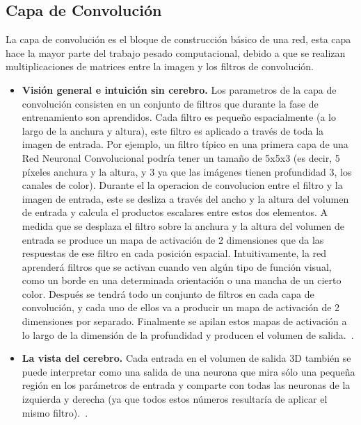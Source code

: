 \subsection{Capa de Convolución}
La capa de convolución es el bloque de construcción básico de una red, esta capa hace la mayor parte del trabajo pesado computacional, debido a que se realizan multiplicaciones de matrices entre la imagen y los filtros de convolución.
\begin{itemize}
\item \textbf{Visión general e intuición sin cerebro.} Los parametros de la capa de convolución consisten en un conjunto de filtros que durante la fase de entrenamiento son aprendidos. Cada filtro es pequeño espacialmente (a lo largo de la anchura y altura), este filtro es aplicado a través de toda la imagen de entrada. Por ejemplo, un filtro típico en una primera capa de una Red Neuronal Convolucional podría tener un tamaño de 5x5x3 (es decir, 5 píxeles anchura y la altura, y 3 ya que las imágenes tienen profundidad 3, los canales de color). Durante el la operacion de convolucion entre el filtro y la imagen de entrada, este se desliza a través del ancho y la altura del volumen de entrada y calcula el productos escalares entre estos dos elementos. A medida que se desplaza el filtro sobre la anchura y la altura del volumen de entrada se produce un mapa de activación de 2 dimensiones que da las respuestas de ese filtro en cada posición espacial. Intuitivamente, la red aprenderá filtros que se activan cuando ven algún tipo de función visual, como un borde en una determinada orientación o una mancha de un cierto color. Después se tendrá todo un conjunto de filtros en cada capa de convolución, y cada uno de ellos va a producir un mapa de activación de 2 dimensiones por separado. Finalmente se apilan estos mapas de activación a lo largo de la dimensión de la profundidad y producen el volumen de salida.~\cite{22RedesNeuronalesConvolu}.

\item \textbf{La vista del cerebro.} Cada entrada en el volumen de salida 3D también se puede interpretar como una salida de una neurona que mira sólo una pequeña región en los parámetros de entrada y comparte con todas las neuronas de la izquierda y derecha (ya que todos estos números resultaría de aplicar el mismo filtro).~\cite{22RedesNeuronalesConvolu}.


\end{itemize}
